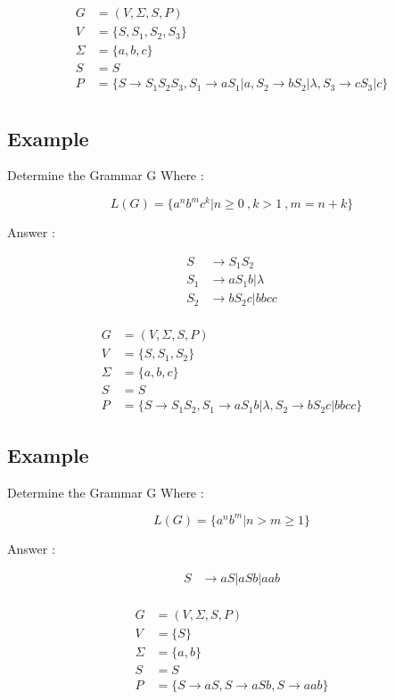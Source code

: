 \documentclass[12pt]{book}
\begin{document}
\begin{align*}
G &= (V, \Sigma, S, P) \\
V &= \{ S , S_{1} , S_{2} , S_{3} \} \\
\Sigma &= \{ a, b, c \} \\
S &= S \\
P &= \{ S \to S_{1}S_{2}S_{3} ,
S_{1} \to aS_{1} | a ,
S_{2} \to bS_{2} | \lambda ,
S_{3} \to cS_{3} | c  \}  \\
\end{align*}

\subsection{Example}

Determine the Grammar G Where :

$$
L(G) = \{ a^{n} b ^{m} c ^{k} | n \geq 0 \: , k > 1 \:, m = n + k \}
$$

Answer :

\begin{align*}
 S &\to S_{1}S_{2} \\
 S_{1} &\to aS_{1}b | \lambda  \\
 S_{2} &\to bS_{2}c | bbcc  \\
\end{align*}


\begin{align*}
G &= (V, \Sigma, S, P) \\
V &= \{ S , S_{1} , S_{2} \} \\
\Sigma &= \{ a, b, c \} \\
S &= S \\
P &= \{ S \to S_{1}S_{2} ,
S_{1} \to aS_{1}b | \lambda ,
S_{2} \to bS_{2}c | bbcc \}
\end{align*}


\subsection{Example}


Determine the Grammar G Where :

$$
L(G) = \{ a^{n} b ^{m} | n > m \geq 1 \}
$$

Answer :

\begin{align*}
 S &\to aS | aSb | aab \\
\end{align*}


\begin{align*}
G &= (V, \Sigma, S, P) \\
V &= \{ S \} \\
\Sigma &= \{ a, b\} \\
S &= S \\
P &= \{ S \to aS ,
S \to aSb  ,
S \to aab  \}
\end{align*}
\end{document}
